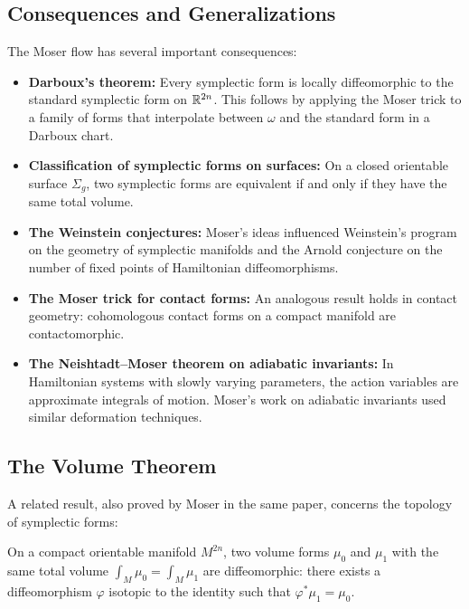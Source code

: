 \subsection{Consequences and Generalizations}

The Moser flow has several important consequences:

\begin{itemize}
\item \textbf{Darboux's theorem:} Every symplectic form is locally diffeomorphic to the standard symplectic form on $\mathbb{R}^{2n}$. This follows by applying the Moser trick to a family of forms that interpolate between $\omega$ and the standard form in a Darboux chart.

\item \textbf{Classification of symplectic forms on surfaces:} On a closed orientable surface $\Sigma_g$, two symplectic forms are equivalent if and only if they have the same total volume.

\item \textbf{The Weinstein conjectures:} Moser's ideas influenced Weinstein's program on the geometry of symplectic manifolds and the Arnold conjecture on the number of fixed points of Hamiltonian diffeomorphisms.

\item \textbf{The Moser trick for contact forms:} An analogous result holds in contact geometry: cohomologous contact forms on a compact manifold are contactomorphic.

\item \textbf{The Neishtadt--Moser theorem on adiabatic invariants:} In Hamiltonian systems with slowly varying parameters, the action variables are approximate integrals of motion. Moser's work on adiabatic invariants used similar deformation techniques.
\end{itemize}

\subsection{The Volume Theorem}

A related result, also proved by Moser in the same paper, concerns the topology of symplectic forms:

\begin{theorem}[Moser, 1965]
On a compact orientable manifold $M^{2n}$, two volume forms $\mu_0$ and $\mu_1$ with the same total volume $\int_M \mu_0 = \int_M \mu_1$ are diffeomorphic: there exists a diffeomorphism $\varphi$ isotopic to the identity such that $\varphi^*\mu_1 = \mu_0$.
\end{theorem}

